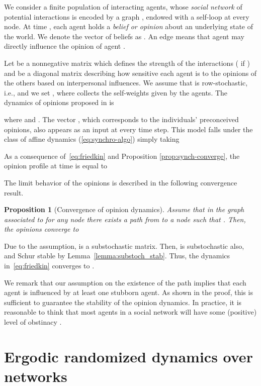 \documentclass{IEEEtran}
\newtheorem{proposition}{Proposition}
\newcommand{\1}{\mathbf{1}} \newcommand{\ind}{\mathds{1}}
\begin{document}
We consider a finite population  of interacting agents, whose {\it social network} of potential interactions is encoded by a graph , endowed with a self-loop   at every node. At time , each agent  holds a {\it belief or opinion} about an underlying state of the world. We denote the vector of beliefs as . An edge  means that agent  may directly influence the opinion of agent .

Let  be a nonnegative matrix which defines the strength of the interactions ( if ) and  be a diagonal matrix describing how sensitive each agent is to the opinions of the others based on interpersonal influences. We assume that  is row-stochastic, i.e.,  and we set , where  collects the self-weights given by the agents.
The dynamics of opinions  proposed in \cite{NEF-ECJ:99} is 

where  and . The vector , which corresponds to the individuals' preconceived opinions, also appears as an input at every time step. This model falls under the class of 
affine dynamics (\ref{eq:synchro-algo}) simply taking 

As a consequence of~\eqref{eq:friedkin} and Proposition \ref{prop:synch-converge}, the opinion profile at time  is equal to 
 
The limit behavior of the opinions is described in the following 
convergence result.

\begin{proposition}[Convergence of opinion dynamics]
\label{prop:convergence-friedkin}
Assume that in the graph
associated to  for any node  there exists a path from
 to a node  such that  . Then, the opinions converge to

\end{proposition}

\begin{IEEEproof}
Due to the assumption,  is a substochastic matrix. Then,  is substochastic also, and 
Schur stable by Lemma~\ref{lemma:substoch_stab}. Thus, the dynamics in~\eqref{eq:friedkin} converges to . 
\end{IEEEproof}

We remark that our assumption on the existence of the path implies that each agent is influenced by at least one stubborn agent.
As shown in the proof, this is sufficient to guarantee the stability of the opinion dynamics.
In practice, it is reasonable to think that most agents in a social network will have some (positive) level of obstinacy .



\section{Ergodic randomized dynamics over networks}\label{sect:randomized}
\end{document}
